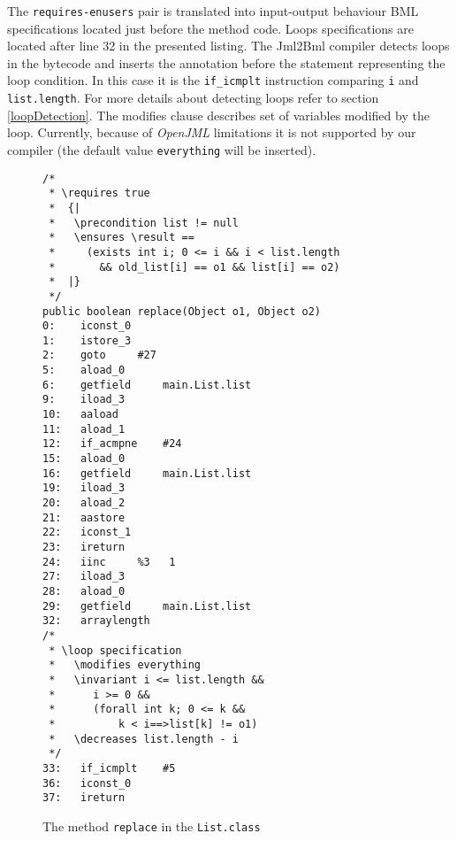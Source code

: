 \documentclass{acm_proc_article-sp}
\begin{document}
The \texttt{requires-enusers} pair is translated into input-output behaviour BML specifications located just before the method code. Loops specifications are located after line 32 in the presented listing. The Jml2Bml compiler detects loops in the bytecode and inserts the annotation before the statement representing the loop condition. In this case it is the \texttt{if\_icmplt} instruction comparing \texttt{i} and \texttt{list.length}. For more details about detecting loops refer to section \ref{loopDetection}. The modifies clause describes set of variables modified by the loop. Currently, because of \textit{OpenJML} limitations it is not supported by our compiler (the default value \texttt{everything} will be inserted).
\begin{figure}
\lstset{basicstyle=\small}

\begin{lstlisting}
/*
 * \requires true
 *  {|
 *   \precondition list != null
 *   \ensures \result ==
 *     (exists int i; 0 <= i && i < list.length
 *       && old_list[i] == o1 && list[i] == o2)
 *  |}
 */
public boolean replace(Object o1, Object o2)
0:    iconst_0
1:    istore_3
2:    goto	   #27
5:    aload_0
6:    getfield	   main.List.list
9:    iload_3
10:   aaload
11:   aload_1
12:   if_acmpne	   #24
15:   aload_0
16:   getfield	   main.List.list
19:   iload_3
20:   aload_2
21:   aastore
22:   iconst_1
23:   ireturn
24:   iinc	   %3	1
27:   iload_3
28:   aload_0
29:   getfield	   main.List.list
32:   arraylength
/*
 * \loop specification
 *   \modifies everything
 *   \invariant i <= list.length &&
 *      i >= 0 &&
 *      (forall int k; 0 <= k &&
 *          k < i==>list[k] != o1)
 *   \decreases list.length - i
 */
33:   if_icmplt	   #5
36:   iconst_0
37:   ireturn

\end{lstlisting}
\label{bytecode}
\caption{The method \texttt{replace} in the \texttt{List.class}}
\end{figure}
\end{document}
